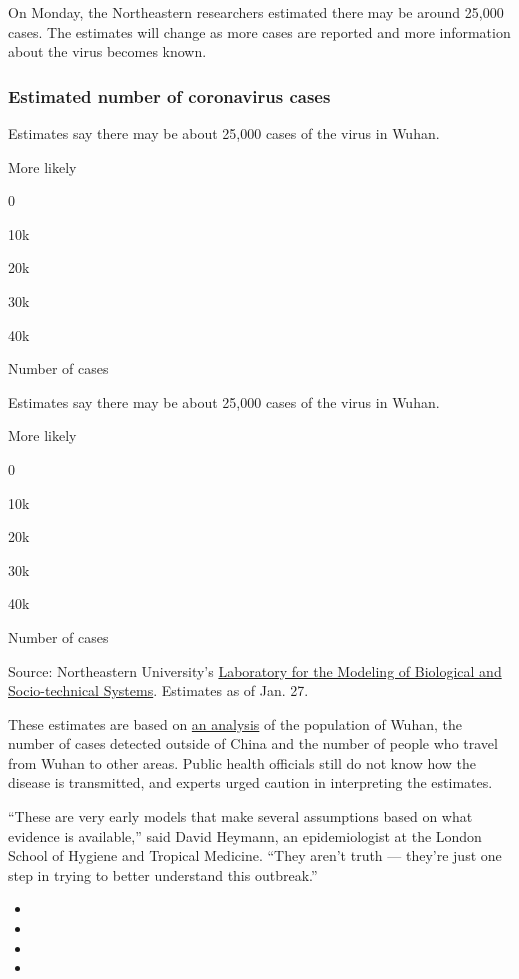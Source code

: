 On Monday, the Northeastern researchers estimated there may be around
25,000 cases. The estimates will change as more cases are reported and
more information about the virus becomes known.

\hypertarget{estimated-number-of-coronavirus-cases}{%
\subsubsection{Estimated number of coronavirus
cases}\label{estimated-number-of-coronavirus-cases}}

Estimates say there may be about 25,000 cases of the virus in Wuhan.

More likely

0

10k

20k

30k

40k

Number of cases

Estimates say there may be about 25,000 cases of the virus in Wuhan.

More likely

0

10k

20k

30k

40k

Number of cases

Source: Northeastern University's
\href{https://www.mobs-lab.org/2019ncov.html}{Laboratory for the
Modeling of Biological and Socio-technical Systems}. Estimates as of
Jan. 27.

These estimates are based on
\href{https://www.mobs-lab.org/2019ncov.html}{an analysis} of the
population of Wuhan, the number of cases detected outside of China and
the number of people who travel from Wuhan to other areas. Public health
officials still do not know how the disease is transmitted, and experts
urged caution in interpreting the estimates.

``These are very early models that make several assumptions based on
what evidence is available,'' said David Heymann, an epidemiologist at
the London School of Hygiene and Tropical Medicine. ``They aren't truth
--- they're just one step in trying to better understand this
outbreak.''

\begin{itemize}
\item
\item
\item
\item
\end{itemize}

